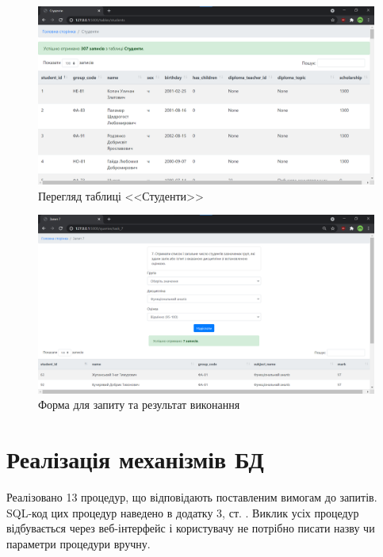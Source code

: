 \begin{figure}[H]
    \centering
    \includegraphics[scale=0.38]{pics/web_table.png}
    \caption{Перегляд таблиці <<Студенти>>}
\end{figure}

\begin{figure}[H]
    \centering
    \includegraphics[scale=0.38]{pics/web_query.png}
    \caption{Форма для запиту та результат виконання}
\end{figure}

\section{Реалізація механізмів БД}
Реалізовано 13 процедур, що відповідають поставленим вимогам до запитів.
SQL-код цих процедур наведено в додатку 3, ст. \pageref{queries}. Виклик усіх процедур
відбувається через веб-інтерфейс і користувачу не потрібно писати назву чи параметри процедури вручну.